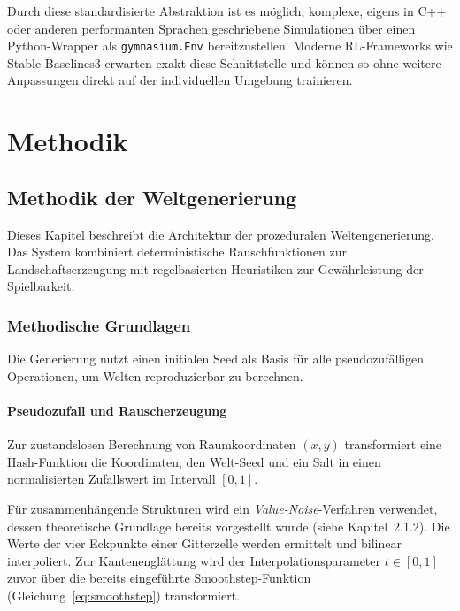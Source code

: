 \documentclass[
  a4paper,
  11pt,
  twoside,
  BCOR=8mm,           %
  headings=big,
  numbers=noenddot,
  listof=totoc,       %
  captions=tableheading,
]{scrreprt}
\begin{document}
Durch diese standardisierte Abstraktion ist es möglich, komplexe, eigens in C++ oder anderen performanten Sprachen geschriebene Simulationen über einen Python-Wrapper als \texttt{gymnasium.Env} bereitzustellen. Moderne RL-Frameworks wie Stable-Baselines3 \cite{raffin2021stable} erwarten exakt diese Schnittstelle und können so ohne weitere Anpassungen direkt auf der individuellen Umgebung trainieren.

\chapter{Methodik}
\label{chap:methodik}

\section{Methodik der Weltgenerierung}
\label{sec:konzept_procedural}

Dieses Kapitel beschreibt die Architektur der prozeduralen Weltengenerierung. Das System kombiniert deterministische Rauschfunktionen zur Landschaftserzeugung mit regelbasierten Heuristiken zur Gewährleistung der Spielbarkeit.

\subsection{Methodische Grundlagen}
\label{sec:fundierung}

Die Generierung nutzt einen initialen Seed als Basis für alle pseudozufälligen Operationen, um Welten reproduzierbar zu berechnen.

\subsubsection{Pseudozufall und Rauscherzeugung}
Zur zustandslosen Berechnung von Raumkoordinaten $(x, y)$ transformiert eine Hash-Funktion die Koordinaten, den Welt-Seed und ein Salt in einen normalisierten Zufallswert im Intervall $[0, 1]$.

Für zusammenhängende Strukturen wird ein \textit{Value-Noise}-Verfahren verwendet, dessen theoretische Grundlage bereits vorgestellt wurde (siehe Kapitel~2.1.2). Die Werte der vier Eckpunkte einer Gitterzelle werden ermittelt und bilinear interpoliert. Zur Kantenenglättung wird der Interpolationsparameter $t \in [0, 1]$ zuvor über die bereits eingeführte Smoothstep-Funktion (Gleichung~\ref{eq:smoothstep}) transformiert.
\end{document}
